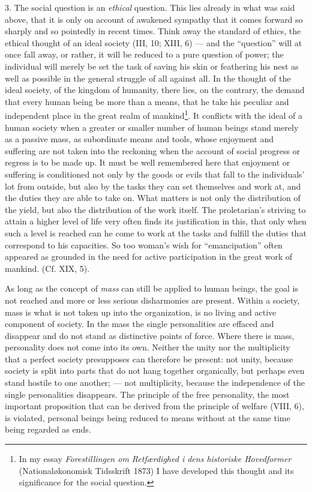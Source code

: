 \documentclass[12pt,a4paper,openany]{book}
\newcommand{\opage}[1]{\marginnote{\footnotesize\textit{[#1]}}}
\begin{document}
3. The social question is an \textit{ethical} question. This lies already in what was said above, that it is only on
account of awakened sympathy that it comes forward so sharply and so pointedly in recent times. Think away the standard
of ethics, the ethical thought of an ideal society (III, 10; XIII, 6) --- and the ``question'' will at once fall away, or
rather, it will be reduced to a pure question of power; the individual will merely be set
\opage{369}the task of saving his skin or feathering his nest as well as possible in the general struggle of all against
all. In the thought of the ideal society, of the kingdom of humanity, there lies, on the contrary, the demand that every
human being be more than a means, that he take his peculiar and independent place in the great realm of
mankind\footnote[1]{In my essay \textit{Forestillingen om Retfærdighed i dens historiske Hovedformer} (Nationaløkonomisk
Tidsskrift 1873) I have developed this thought and its significance for the social question.}. It conflicts with the
ideal of a human society when a greater or smaller number of human beings stand merely as a passive mass, as subordinate
means and tools, whose enjoyment and suffering are not taken into the reckoning when the account of social progress or
regress is to be made up. It must be well remembered here that enjoyment or suffering is conditioned not only by the goods
or evils that fall to the individuals' lot from outside, but also by the tasks they can set themselves and work at, and
the duties they are able to take on. What matters is not only the distribution of the yield, but also the distribution of
the work itself. The proletarian's striving to attain a higher level of life very often finds its justification in this,
that only when such a level is reached can he come to work at the tasks and fulfill the duties that correspond to his
capacities. So too woman's wish for ``emancipation'' often appeared as grounded in the need for active participation in
the great work of mankind. (Cf. XIX, 5).

As long as the concept of \textit{mass} can still be applied to human beings, the goal is not reached and more or less
serious disharmonies are present. Within a society, mass is what is not taken up into the organization, is no living and
active component of society. In the mass the single personalities are effaced and disappear and do not stand as
distinctive points of force. Where there is mass, personality does not come into its own. Neither the unity nor the
multiplicity that a perfect society presupposes can therefore be present: not unity, because society is split
\opage{370}into parts that do not hang together organically, but perhaps even stand hostile to one another; --- not
multiplicity, because the independence of the single personalities disappears. The principle of the free personality,
the most important proposition that can be derived from the principle of welfare (VIII, 6), is violated, personal beings
being reduced to means without at the same time being regarded as ends.
\end{document}

